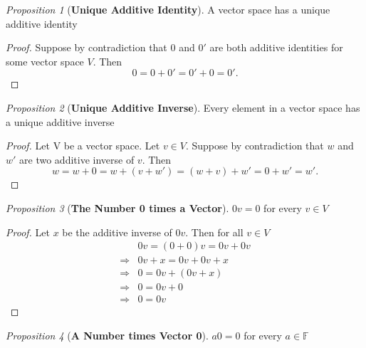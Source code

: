 \documentclass[paper=a4, fontsize=11pt]{scrartcl}
\numberwithin{equation}{section}		%
\numberwithin{figure}{section}			%
\numberwithin{table}{section}				%
\theoremstyle{definition}
\theoremstyle{remark}
\theoremstyle{example}
\newtheorem{prop}{Proposition}[section]
\begin{document}
\begin{prop}[\textbf{Unique Additive Identity}]
    A vector space has a unique additive identity
\end{prop}

\begin{proof}
    Suppose by contradiction that $0$ and $0'$ are both additive identities for some vector space $V$. Then
    \begin{equation}
        0 = 0 + 0' = 0' + 0 = 0'.
    \end{equation}
\end{proof}

\begin{prop}[\textbf{Unique Additive Inverse}]
    Every element in a vector space has a unique additive inverse
\end{prop}

\begin{proof}
    Let V be a vector space. Let $v \in V$. Suppose by contradiction that $w$ and $w'$ are two additive inverse of $v$. Then
    \begin{equation}
        w = w + 0 = w + (v + w') = (w + v) + w' = 0 + w' = w'.
    \end{equation}
\end{proof}

\begin{prop}[\textbf{The Number 0 times a Vector}]
    $0v = 0$ for every $v \in V$
\end{prop}

\begin{proof}
    Let $x$ be the additive inverse of $0v$. Then for all $v \in V$
    \begin{equation}
        \begin{aligned}
            &0v = (0 + 0)v = 0v + 0v\\
            \Rightarrow &0v + x = 0v + 0v + x\\
            \Rightarrow &0 = 0v + (0v + x)\\
            \Rightarrow &0 = 0v + 0\\
            \Rightarrow &0 = 0v
        \end{aligned}
    \end{equation}
\end{proof}

\begin{prop}[\textbf{A Number times Vector 0}]
    $a0 = 0$ for every $a \in \mathbb{F}$
\end{prop}
\end{document}

